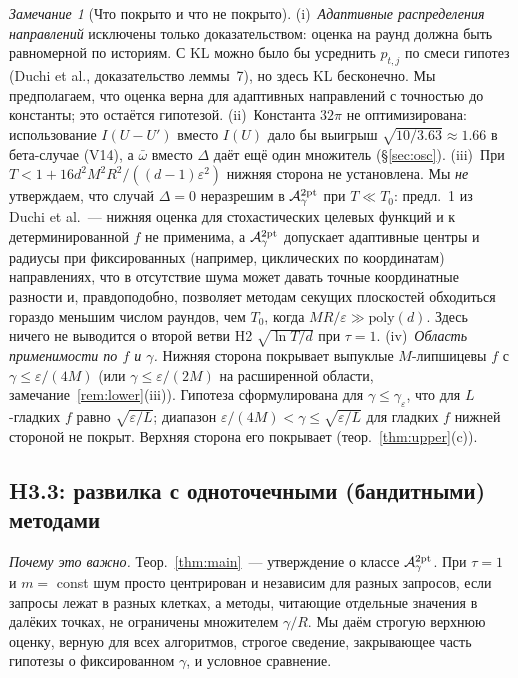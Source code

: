 \documentclass[11pt,a4paper]{article}
\numberwithin{equation}{section}
\theoremstyle{definition}
\theoremstyle{remark}
\newtheorem{remark}[theorem]{Замечание}
\newcommand{\wbar}{\bar\omega}\newcommand{\Atwo}{\cA^{\rm 2pt}_\gamma}
\begin{document}
\begin{remark}[Что покрыто и что не покрыто]\label{rem:scope}
(i)~\emph{Адаптивные распределения направлений} исключены только доказательством: оценка на раунд должна быть равномерной по историям. С KL можно было бы усреднить $p_{t,j}$ по смеси гипотез (Duchi et al., доказательство леммы~7), но здесь KL бесконечно. Мы предполагаем, что оценка верна для адаптивных направлений с точностью до константы; это остаётся гипотезой. (ii)~Константа $32\pi$ не оптимизирована: использование $I(U-U')$ вместо $I(U)$ дало бы выигрыш $\sqrt{10/3.63}\approx1.66$ в бета-случае (V14), а $\wbar$ вместо $\Delta$ даёт ещё один множитель (\S\ref{sec:osc}). (iii)~При $T<1+16d^2M^2R^2/((d-1)\varepsilon^2)$ нижняя сторона не установлена. Мы \emph{не} утверждаем, что случай $\Delta=0$ неразрешим в $\Atwo$ при $T\ll T_0$: предл.~1 из Duchi et al.~--- нижняя оценка для стохастических целевых функций и к детерминированной $f$ не применима, а $\Atwo$ допускает адаптивные центры и радиусы при фиксированных (например, циклических по координатам) направлениях, что в отсутствие шума может давать точные координатные разности и, правдоподобно, позволяет методам секущих плоскостей обходиться гораздо меньшим числом раундов, чем $T_0$, когда $MR/\varepsilon\gg\mathrm{poly}(d)$. Здесь ничего не выводится о второй ветви H2 $\sqrt{\ln T/d}$ при $\tau=1$. (iv)~\emph{Область применимости по $f$ и $\gamma$.} Нижняя сторона покрывает выпуклые $M$-липшицевы $f$ с $\gamma\le\varepsilon/(4M)$ (или $\gamma\le\varepsilon/(2M)$ на расширенной области, замечание~\ref{rem:lower}(iii)). Гипотеза сформулирована для $\gamma\le\gamma_\varepsilon$, что для $L$-гладких $f$ равно $\sqrt{\varepsilon/L}$; диапазон $\varepsilon/(4M)<\gamma\le\sqrt{\varepsilon/L}$ для гладких $f$ нижней стороной не покрыт. Верхняя сторона его покрывает (теор.~\ref{thm:upper}(c)).
\end{remark}

\subsection{H3.3: развилка с одноточечными (бандитными) методами}\label{sec:fork}
\emph{Почему это важно.} Теор.~\ref{thm:main}~--- утверждение о классе $\Atwo$. При $\tau=1$ и $m=$ const шум просто центрирован и независим для разных запросов, если запросы лежат в разных клетках, а методы, читающие отдельные значения в далёких точках, не ограничены множителем $\gamma/R$. Мы даём строгую верхнюю оценку, верную для всех алгоритмов, строгое сведение, закрывающее часть гипотезы о фиксированном $\gamma$, и условное сравнение.
\end{document}
